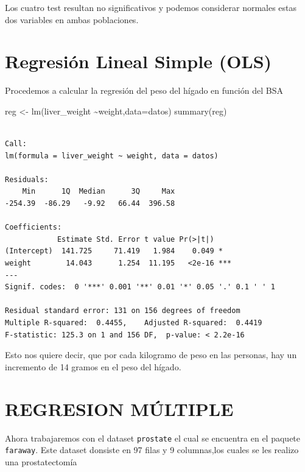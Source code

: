 \documentclass[
  letterpaper,
  DIV=11,
  numbers=noendperiod]{scrartcl}
\newenvironment{Shaded}{\begin{snugshade}}{\end{snugshade}}
\newcommand{\AttributeTok}[1]{\textcolor[rgb]{0.40,0.45,0.13}{#1}}
\newcommand{\FunctionTok}[1]{\textcolor[rgb]{0.28,0.35,0.67}{#1}}
\newcommand{\NormalTok}[1]{\textcolor[rgb]{0.00,0.23,0.31}{#1}}
\newcommand{\OtherTok}[1]{\textcolor[rgb]{0.00,0.23,0.31}{#1}}
\newcommand{\SpecialCharTok}[1]{\textcolor[rgb]{0.37,0.37,0.37}{#1}}
\begin{document}
Los cuatro test resultan no significativos y podemos considerar normales
estas dos variables en ambas poblaciones.

\hypertarget{regresiuxf3n-lineal-simple-ols}{%
\section{Regresión Lineal Simple
(OLS)}\label{regresiuxf3n-lineal-simple-ols}}

Procedemos a calcular la regresión del peso del hígado en función del
BSA

\begin{Shaded}
\begin{Highlighting}[]
\NormalTok{reg }\OtherTok{\textless{}{-}} \FunctionTok{lm}\NormalTok{(liver\_weight }\SpecialCharTok{\textasciitilde{}}\NormalTok{weight,}\AttributeTok{data=}\NormalTok{datos)}
\FunctionTok{summary}\NormalTok{(reg)}
\end{Highlighting}
\end{Shaded}

\begin{verbatim}

Call:
lm(formula = liver_weight ~ weight, data = datos)

Residuals:
    Min      1Q  Median      3Q     Max 
-254.39  -86.29   -9.92   66.44  396.58 

Coefficients:
            Estimate Std. Error t value Pr(>|t|)    
(Intercept)  141.725     71.419   1.984    0.049 *  
weight        14.043      1.254  11.195   <2e-16 ***
---
Signif. codes:  0 '***' 0.001 '**' 0.01 '*' 0.05 '.' 0.1 ' ' 1

Residual standard error: 131 on 156 degrees of freedom
Multiple R-squared:  0.4455,    Adjusted R-squared:  0.4419 
F-statistic: 125.3 on 1 and 156 DF,  p-value: < 2.2e-16
\end{verbatim}

Esto nos quiere decir, que por cada kilogramo de peso en las personas,
hay un incremento de 14 gramos en el peso del hígado.

\hypertarget{regresion-muxfaltiple}{%
\section{REGRESION MÚLTIPLE}\label{regresion-muxfaltiple}}

Ahora trabajaremos con el dataset \texttt{prostate} el cual se encuentra
en el paquete \texttt{faraway}. Este dataset donsiste en 97 filas y 9
columnas,los cuales se les realizo una prostatectomía
\end{document}
